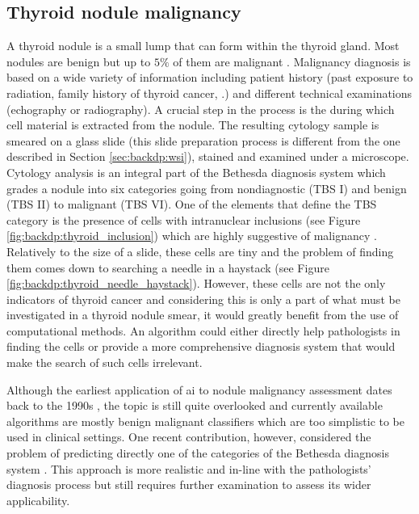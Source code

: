 \subsection{Thyroid nodule malignancy}
\label{ssec:backdp:analysis_thyroid}

A thyroid nodule is a small lump that can form within the thyroid gland. Most nodules are benign but up to $5\%$ of them are malignant \cite{yeung2008management}. Malignancy diagnosis is based on a wide variety of information including patient history (past exposure to radiation, family history of thyroid cancer, \etc.) and different technical examinations (\eg echography or radiography). A crucial step in the process is the  during which cell material is extracted from the nodule. The resulting cytology sample is smeared on a glass slide (this slide preparation process is different from the one described in Section \ref{sec:backdp:wsi}), stained and examined under a microscope. Cytology analysis is an integral part of the Bethesda diagnosis system \cite{bychkov2022bethesda} which grades a nodule into six categories going from nondiagnostic (TBS I) and benign (TBS II) to malignant (TBS VI). One of the elements that define the TBS category is the presence of cells with intranuclear inclusions (see Figure \ref{fig:backdp:thyroid_inclusion}) which are highly suggestive of malignancy \cite{arena2014intranuclear}. Relatively to the size of a slide, these cells are tiny and the problem of finding them comes down to searching a needle in a haystack (see Figure \ref{fig:backdp:thyroid_needle_haystack}). However, these cells are not the only indicators of thyroid cancer and considering this is only a part of what must be investigated in a thyroid nodule smear, it would greatly benefit from the use of computational methods. An algorithm could either directly help pathologists in finding the cells or provide a more comprehensive diagnosis system that would make the search of such cells irrelevant. 

Although the earliest application of \acrlong{ai} to nodule malignancy assessment dates back to the 1990s \cite{karakitsos1999learning}, the topic is still quite overlooked and currently available algorithms are mostly benign \vs malignant classifiers \cite{kezlarian2021artificial} which are too simplistic to be used in clinical settings. One recent contribution, however, considered the problem of predicting directly one of the categories of the Bethesda diagnosis system \cite{elliott2020application}. This approach is more realistic and in-line with the pathologists' diagnosis process but still requires further examination to assess its wider applicability.

